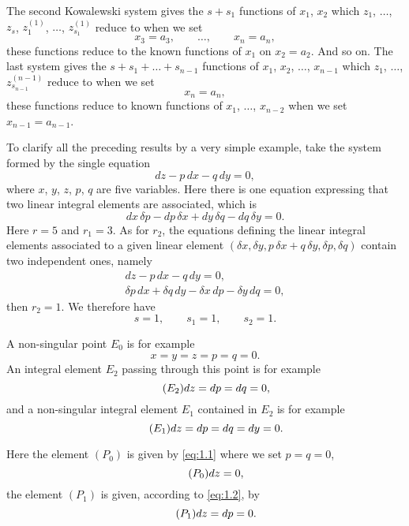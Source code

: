 \documentclass[leqno,11pt]{book}
\theoremstyle{shape1}
\theoremstyle{shapesmall}
\begin{document}
The second Kowalewski system gives the $s+s_{1}$ functions of $x_{1}$, $x_{2}$ which $z_{1}$, $\dots$, $z_{s}$, $z_{1}^{(1)}$, $\dots$, $z_{s_{1}}^{(1)}$ reduce to when we set
\[
x_{3}=a_{3},\qquad \dots,\qquad x_{n}=a_{n},
\]
these functions reduce to the known functions of $x_{1}$ on $x_{2}=a_{2}$. And so on. The last system gives the $s+s_{1}+\dots+s_{n-1}$ functions of $x_{1}$, $x_{2}$, $\dots$, $x_{n-1}$ which $z_{1}$, $\dots$, $z_{s_{n-1}}^{(n-1)}$ reduce to when we set
\[
x_{n}=a_{n},
\]
these functions reduce to known functions of $x_{1}$, $\dots$, $x_{n-2}$ when we set $x_{n-1}=a_{n-1}$.

To clarify all the preceding results by a very simple example, take the system formed by the single equation
\begin{equation}
  \label{eq:1.1}
  dz-p\,dx-q\,dy=0,
\end{equation}
where $x$, $y$, $z$, $p$, $q$ are five variables. Here there is one equation expressing that two linear integral elements are associated, which is
\begin{equation}
  \label{eq:1.2}
  dx\,\delta p-dp\,\delta x+dy\,\delta q-dq\,\delta y=0.
\end{equation}
Here $r=5$ and $r_{1}=3$. As for $r_{2}$, the equations defining the linear integral elements associated to a given linear element $(\delta x, \delta y, p\,\delta x+q\,\delta y,\delta p,\delta q)$ contain two independent ones, namely
\begin{gather*}
  dz-p\,dx-q\,dy=0,\\
  \delta p\,dx+\delta q\,dy-\delta x\,dp-\delta y\,dq=0,
\end{gather*}
then $r_{2}=1$. We therefore have
\[
s=1,\qquad s_{1}=1,\qquad s_{2}=1.
\]

A non-singular point $E_{0}$ is for example
\[
x=y=z=p=q=0.
\]
An integral element $E_{2}$ passing through this point is for example
\begin{equation}
  \label{eq:1.E2}\tag{$E_{2}$}
  dz=dp=dq=0,
\end{equation}
and a non-singular integral element $E_{1}$ contained in $E_{2}$ is for example
\begin{equation}
  \label{eq:1.E1}\tag{$E_{1}$}
  dz=dp=dq=dy=0.
\end{equation}

Here the element $(P_{0})$ is given by \eqref{eq:1.1} where we set $p=q=0$,
\begin{equation}
  \label{eq:1.P0}\tag{$P_{0}$}
  dz=0,
\end{equation}
the element $(P_{1})$ is given, according to \eqref{eq:1.2}, by
\begin{equation}
  \label{eq:1.P1}\tag{$P_{1}$}
  dz=dp=0.
\end{equation}
\end{document}
